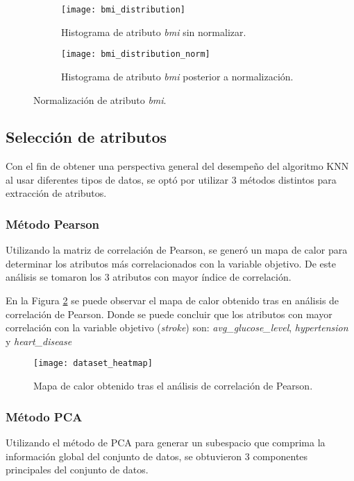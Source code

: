 \begin{figure}[!htb]
	\centering
	\begin{subfigure}[b]{0.85\textwidth}
		\centering
		\texttt{[image: bmi\_distribution]}
		\caption{Histograma de atributo \emph{bmi} sin normalizar.}
	\end{subfigure}
	\hfill
	\begin{subfigure}[b]{0.85\textwidth}
		\centering
		\texttt{[image: bmi\_distribution\_norm]}
		\caption{Histograma de atributo \emph{bmi} posterior a normalización.}
	\end{subfigure}
	\caption{Normalización de atributo \emph{bmi}.}
	\label{Fig: bmi_norm}
\end{figure}

\FloatBarrier
\subsection{Selección de atributos}
Con el fin de obtener una perspectiva general del desempeño del algoritmo KNN al usar diferentes tipos de datos, se optó por utilizar 3 métodos distintos para extracción de atributos.

\subsubsection{Método Pearson}
Utilizando la matriz de correlación de Pearson, se generó un mapa de calor para determinar los atributos más correlacionados con la variable objetivo. De este análisis se tomaron los 3 atributos con mayor índice de correlación.

En la Figura \ref{Fig: Pearson} se puede observar el mapa de calor obtenido tras en análisis de correlación de Pearson. Donde se puede concluir que los atributos con mayor correlación con la variable objetivo (\emph{stroke}) son: \emph{avg\_glucose\_level}, \emph{hypertension} y \emph{heart\_disease}

\begin{figure}[htbp]
	\centering
	\texttt{[image: dataset\_heatmap]}
	\caption{Mapa de calor obtenido tras el análisis de correlación de Pearson.}
	\label{Fig: Pearson}
\end{figure}

\subsubsection{Método PCA}
Utilizando el método de PCA para generar un subespacio que comprima la información global del conjunto de datos, se obtuvieron 3 componentes principales del conjunto de datos.

